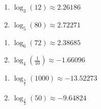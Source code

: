 \begin{multicols}{2}
\begin{enumerate}
\setcounter{enumi}{\value{HW}}

\item $\log_{3}(12) \approx 2.26186$
\item $\log_{5}(80) \approx 2.72271$

\setcounter{HW}{\value{enumi}}
\end{enumerate}
\end{multicols}

\begin{multicols}{2}
\begin{enumerate}
\setcounter{enumi}{\value{HW}}

\item $\log_{6}(72) \approx 2.38685$
\item $\log_{4}\left(\frac{1}{10}\right) \approx -1.66096$

\setcounter{HW}{\value{enumi}}
\end{enumerate}
\end{multicols}

\begin{multicols}{2}
\begin{enumerate}
\setcounter{enumi}{\value{HW}}
\item $\log_{\frac{3}{5}}(1000) \approx -13.52273$
\item $\log_{\frac{2}{3}}(50) \approx -9.64824$

\setcounter{HW}{\value{enumi}}
\end{enumerate}
\end{multicols}

\closegraphsfile